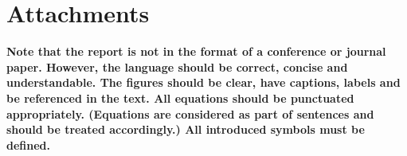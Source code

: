 \documentclass[10pt,a4paper]{article}
\begin{document}
\newpage
\section*{Attachments}
    
	
	
	

{\bf Note that the report is not in the format of a conference or journal paper. However, the language should be correct, concise and understandable. The figures should be clear, have captions, labels and be referenced in the text. All equations should be punctuated appropriately. (Equations are considered as part of sentences and should be treated accordingly.) All introduced symbols must be defined.}
\end{document}
